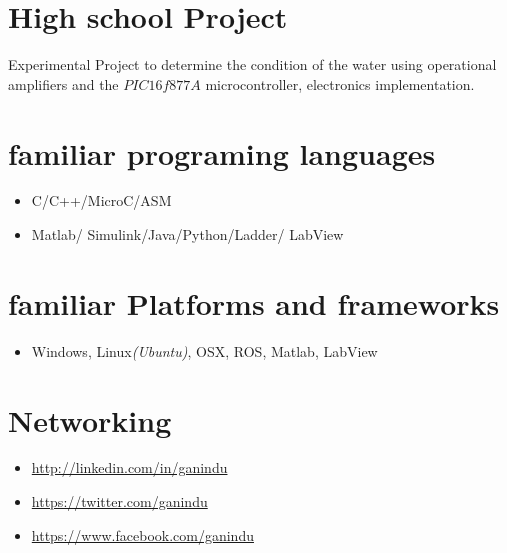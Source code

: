 \documentclass[margin]{res}
\begin{document}
\begin{resume}
\section{High school Project} Experimental Project to determine the condition of
the water using operational amplifiers and the $PIC16f877A$
microcontroller, electronics implementation.

\section{familiar programing languages}
\begin{itemize} \itemsep -2pt
  \item C/C++/MicroC\textsuperscript{\ssmall{\textregistered}}/ASM
  \item
  Matlab\textsuperscript{\ssmall{\textregistered}}/
  Simulink\textsuperscript{\ssmall{\textregistered}}/Java/Python/Ladder/
  LabView\textsuperscript{\ssmall{\textregistered}}
\end{itemize}

\section{familiar Platforms and frameworks}
\begin{itemize} \itemsep -2pt
  \item Windows\textsuperscript{\ssmall{\textregistered}},
  Linux\textit{(Ubuntu)}, OSX\textsuperscript{\ssmall{\textregistered}}, ROS,
  Matlab\textsuperscript{\ssmall{\textregistered}}, LabView\textsuperscript{\ssmall{\textregistered}}
\end{itemize}

\section{Networking}
\begin{itemize} \itemsep -2pt
  \item \url{http://linkedin.com/in/ganindu}
  \item \url{https://twitter.com/ganindu}
  \item \url{https://www.facebook.com/ganindu}
\end{itemize}



\end{resume}
\end{document}
